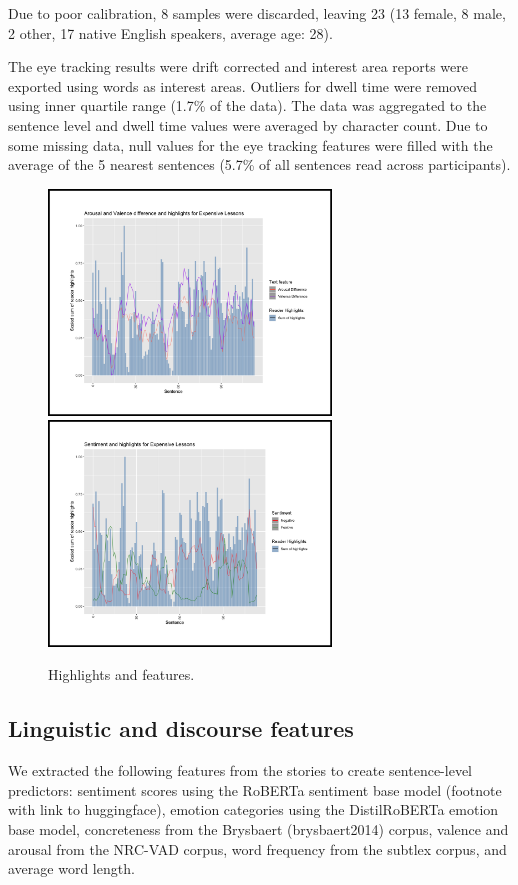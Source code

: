 \documentclass[11pt]{article}
\begin{document}
Due to poor calibration, 8 samples were discarded, leaving 23 (13 female, 8 male, 2 other, 17 native English speakers, average age: 28).

The eye tracking results were drift corrected and interest area reports were exported using words as interest areas. Outliers for dwell time were removed using inner quartile range (1.7\% of the data). The data was aggregated to the sentence level and dwell time values were averaged by character count. Due to some missing data, null values for the eye tracking features were filled with the average of the 5 nearest sentences (5.7\% of all sentences read across participants).

\begin{figure}
  \includegraphics[height=6cm]{el_highlights_val_arousal}
  \includegraphics[height=6cm]{el_highlights_sentiment}
  \caption{Highlights and features.}
\end{figure}

\subsection{Linguistic and discourse features}

We extracted the following features from the stories to create sentence-level predictors: sentiment scores using the RoBERTa sentiment base model (footnote with link to huggingface), emotion categories using the DistilRoBERTa emotion base model, concreteness from the Brysbaert (brysbaert2014) corpus, valence and arousal from the NRC-VAD corpus, word frequency from the subtlex corpus, and average word length.
\end{document}
